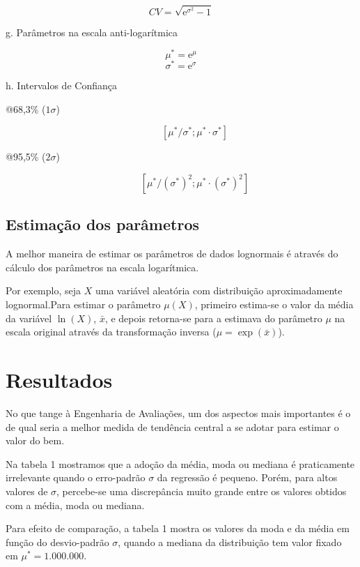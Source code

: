 \documentclass[final, xcolor={table}]{beamer}
\begin{document}
\begin{frame}[t]
\begin{multicols}{3}
$$CV = \sqrt{\mathrm{e}^{\sigma^2}-1}$$

g. Parâmetros na escala anti-logarítmica

$$\mu^* = \mathrm{e}^\mu$$
$$\sigma^* = \mathrm{e}^\sigma$$

h. Intervalos de Confiança

\begin{description}
  \item[@68,3\% ($1\sigma$)]
  $$[\mu^*/\sigma^*; \mu^* \cdot \sigma^*]$$
  \item[@95,5\% ($2\sigma$)]
  $$[\mu^*/(\sigma^*)^2; \mu^* \cdot (\sigma^*)^2]$$
\end{description}


\vfill\null
\columnbreak

\subsection{Estimação dos parâmetros}

A melhor maneira de estimar os parâmetros de dados lognormais é através do cálculo
dos parâmetros na escala logarítmica.

Por exemplo, seja $X$ uma variável aleatória com distribuição aproximadamente 
lognormal.Para estimar o parâmetro $\mu(X)$, primeiro estima-se o valor da média 
da variável $\ln(X)$, $\bar{x}$, e depois retorna-se para a estimava do parâmetro $\mu$ 
na escala original através da transformação inversa ($\mu = \exp(\bar{x})$).

\section{Resultados}

No que tange à Engenharia de Avaliações, um dos aspectos mais importantes é o de qual
seria a melhor medida de tendência central a se adotar para estimar o valor do bem.

Na tabela 1 mostramos que a adoção da média, moda ou mediana é praticamente irrelevante
quando o erro-padrão $\sigma$ da regressão é pequeno. Porém, para altos valores de $\sigma$,
percebe-se uma discrepância muito grande entre os valores obtidos com a média, moda ou mediana.

Para efeito de comparação, a tabela 1 mostra os valores da moda e da média em função
do desvio-padrão $\sigma$, quando a mediana da distribuição tem valor fixado em
$\mu^* = 1.000.000$.


\end{multicols}
\end{frame}
\end{document}
